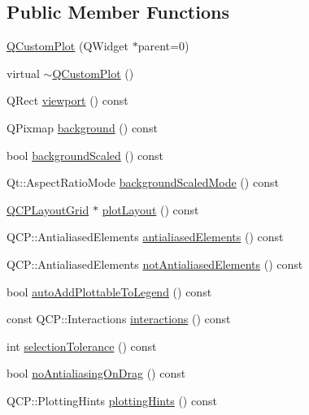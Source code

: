 \subsection*{Public Member Functions}
\begin{DoxyCompactItemize}
\item 
\hyperlink{class_q_custom_plot_a45b99626558651a6428b83972b0b34b8}{Q\-Custom\-Plot} (Q\-Widget $\ast$parent=0)
\item 
virtual \hyperlink{class_q_custom_plot_a75d9b6f599dcae706e45efd425c5499e}{$\sim$\-Q\-Custom\-Plot} ()
\item 
Q\-Rect \hyperlink{class_q_custom_plot_a953ecdbc28018e7e84cb6213ad3d88c2}{viewport} () const 
\item 
Q\-Pixmap \hyperlink{class_q_custom_plot_a4643ddc8249cc4f51725650677c2b779}{background} () const 
\item 
bool \hyperlink{class_q_custom_plot_af9a6e0fe88e4b8ae5504ee9646abb121}{background\-Scaled} () const 
\item 
Qt\-::\-Aspect\-Ratio\-Mode \hyperlink{class_q_custom_plot_a3394512baf54fbcdc7613ac44a07c3b6}{background\-Scaled\-Mode} () const 
\item 
\hyperlink{class_q_c_p_layout_grid}{Q\-C\-P\-Layout\-Grid} $\ast$ \hyperlink{class_q_custom_plot_afd280d4d621ae64a106543a545c508d7}{plot\-Layout} () const 
\item 
Q\-C\-P\-::\-Antialiased\-Elements \hyperlink{class_q_custom_plot_a81e954fbb485bb44c609e5707f0067b3}{antialiased\-Elements} () const 
\item 
Q\-C\-P\-::\-Antialiased\-Elements \hyperlink{class_q_custom_plot_a8060cee59757213764382a78d3196189}{not\-Antialiased\-Elements} () const 
\item 
bool \hyperlink{class_q_custom_plot_ad1599fc3fd1833b5988f6b89c1f616ca}{auto\-Add\-Plottable\-To\-Legend} () const 
\item 
const Q\-C\-P\-::\-Interactions \hyperlink{class_q_custom_plot_a12401c02b6949a717f5749bb28c62983}{interactions} () const 
\item 
int \hyperlink{class_q_custom_plot_a7b738074c75e80070ef6a10263c6cd69}{selection\-Tolerance} () const 
\item 
bool \hyperlink{class_q_custom_plot_ae07f2895a34d13a97a10cae4d8e17a36}{no\-Antialiasing\-On\-Drag} () const 
\item 
Q\-C\-P\-::\-Plotting\-Hints \hyperlink{class_q_custom_plot_a130b55e205697a5288081e9fc11e443e}{plotting\-Hints} () const 
\item 

\end{DoxyCompactItemize}
